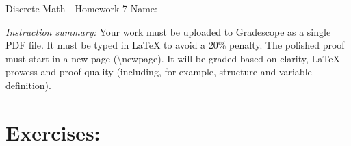 \documentclass[12pt]{article}
\begin{document}
\begin{center}
	{\LARGE Discrete Math - Homework 7} \Large \newline
    Name:
\end{center}

\noindent \emph{Instruction summary:} Your work must be uploaded to Gradescope as a single PDF file. It must be typed in LaTeX to avoid a 20\% penalty. The polished proof must start in a new page (\textbackslash{newpage}). It will be graded based on clarity, LaTeX prowess and proof quality (including, for example, structure and variable definition).

\section*{Exercises:}
\end{document}
